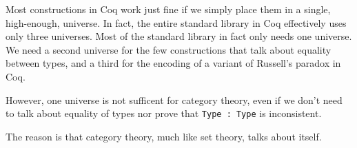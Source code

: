 Most constructions in Coq work just fine if we simply place them in a single, high-enough, universe.
In fact, the entire standard library in Coq effectively uses only three universes.
Most of the standard library in fact only needs one universe.
We need a second universe for the few constructions that talk about equality between types, and a third for the encoding of a variant of Russell's paradox in Coq.

However, one universe is not sufficent for category theory, even if we don't need to talk about equality of types nor prove that \texttt{Type : Type} is inconsistent.

The reason is that category theory, much like set theory, talks about itself.
\begin{comment}

\subsection{Complications from Categories of Categories}

    Some complications arise in applying the last subsection's definition of categories to the full range of common constructs in category theory.  One particularly prominent example formalizes the structure of a collection of categories, showing that this collection itself may be considered as a category.

    The morphisms in such a category are \emph{functors},\label{sec:define-functor} maps between categories consisting of a function on objects, a function on hom-types, and proofs that these functions respect composition and identity~\cite{mac1998categories,awodey2010category,HoTTBook}.

    The na\"ive concept of a ``category of all categories,'' \label{sec:category-of-categories} which includes even itself, leads into mathematical inconsistencies, which manifest as universe inconsistency errors in Coq.  The standard resolution is to introduce a hierarchy of categories, where, for instance, most intuitive constructions are considered \emph{small} categories, and then we also have \emph{large} categories, one of which is the category of small categories.  Both definitions wind up with literally the same text in Coq, giving:
\begin{coqcode}
\coqdockw{Definition} \coqdocdefinition{SmallCat} : \coqdocrecord{LargeCategory} :=
  \{| \coqdocprojection{Ob} := \coqdocrecord{SmallCategory};
     \coqdocprojection{Hom} \coqdocvariable{C} \coqdocvariable{D} := \coqdocrecord{SmallFunctor} \coqdocvariable{C} \coqdocvariable{D}; ... |\}.
\end{coqcode}


\end{comment}
